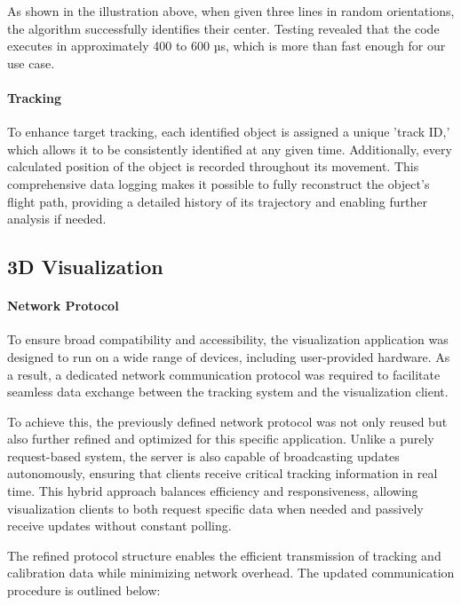 As shown in the illustration above, when given three lines in random orientations, the algorithm successfully identifies their center. Testing revealed that the code executes in approximately 400 to 600 µs, which is more than fast enough for our use case.

\paragraph{Tracking}
To enhance target tracking, each identified object is assigned a unique 'track ID,' which allows it to be consistently identified at any given time. Additionally, every calculated position of the object is recorded throughout its movement. This comprehensive data logging makes it possible to fully reconstruct the object's flight path, providing a detailed history of its trajectory and enabling further analysis if needed.


\subsection{3D Visualization}
\paragraph{Network Protocol}  
To ensure broad compatibility and accessibility, the visualization application was designed to run on a wide range of devices, including user-provided hardware. As a result, a dedicated network communication protocol was required to facilitate seamless data exchange between the tracking system and the visualization client.  

To achieve this, the previously defined network protocol was not only reused but also further refined and optimized for this specific application. Unlike a purely request-based system, the server is also capable of broadcasting updates autonomously, ensuring that clients receive critical tracking information in real time. This hybrid approach balances efficiency and responsiveness, allowing visualization clients to both request specific data when needed and passively receive updates without constant polling.  

The refined protocol structure enables the efficient transmission of tracking and calibration data while minimizing network overhead. The updated communication procedure is outlined below:  

